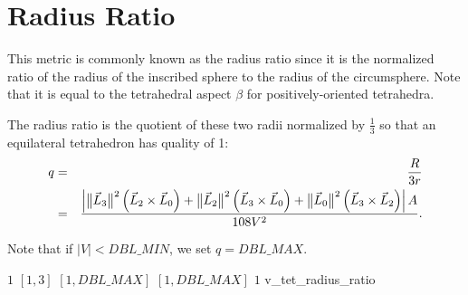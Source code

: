 \section{Radius Ratio\label{s:tet-radius-ratio}}

This metric is commonly known as the radius ratio since it is the
normalized ratio of the radius of the inscribed sphere to the radius
of the circumsphere. Note that it is equal to the tetrahedral aspect
$\beta$ for positively-oriented tetrahedra.  

The radius ratio is the quotient of these two radii normalized by $\frac{1}{3}$ so
that an equilateral tetrahedron has quality of 1:
\begin{eqnarray*}
q & = & \frac{R}{3 r} \nonumber \\
  & = & \frac { \left| 
   \big\lVert{\vec L_3}\big\rVert^2 \left( \vec L_2 \times \vec L_0 \right) + 
   \big\lVert{\vec L_2}\big\rVert^2 \left( \vec L_3 \times \vec L_0 \right) + 
   \big\lVert{\vec L_0}\big\rVert^2 \left( \vec L_3 \times \vec L_2 \right)
   \right| A}{108 V^2}.
\end{eqnarray*}

Note that if $|V| < DBL\_MIN$, we set $q = DBL\_MAX$.

%
{$1$}%
{$[1,3]$}%
{$[1,DBL\_MAX]$}%
{$[1,DBL\_MAX]$}%
{$1$}%
{\cite{par:93}}%
{v\_tet\_radius\_ratio}%


